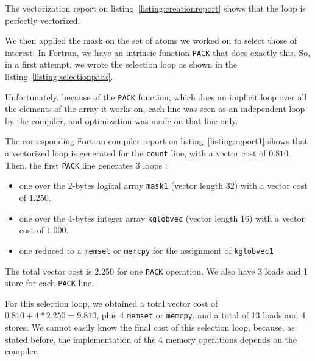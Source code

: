 \documentclass[9pt,comparison]{livecoms}
\newcommand{\lv}{\Large\verb}
\begin{document}
 The vectorization report on listing~\ref{listing:creationreport} shows that the loop is perfectly vectorized.
 



We then applied the mask on the set of atoms we worked on to select those of interest. In Fortran, we have an intrinsic function {\color{blue}\lv|PACK|} that does exactly this. So, in a first attempt, we wrote the selection loop as shown in the listing~\ref{listing:selectionpack}.\label{PACK} 

Unfortunately, because of the {\color{blue}\lv|PACK|} function, which does an implicit loop over all the elements of the array it works on, each line was seen as an independent loop by the compiler, and optimization was made on that line only. 

The corresponding Fortran compiler report on  listing~\ref{listing:report1} shows that a vectorized loop is generated for the {\color{blue}\lv|count|} line, with a vector cost of $0.810$. Then, the first {\color{blue}\lv|PACK|} line generates 3 loops :
\begin{itemize}
    \item one over the 2-bytes logical array {\color{blue}\lv|mask1|} (vector length 32) with a vector cost of $1.250$.
    \item one over the 4-bytes integer array {\color{blue}\lv|kglobvec|} (vector length 16) with a vector cost of $1.000$.
    \item one reduced to a {\color{codegreen}\lv|memset|} or {\color{codegreen}\lv|memcpy|} for the assignment of {\color{blue}\lv|kglobvec1|}
\end{itemize}

The total vector cost is $2.250$ for one {\color{blue}\lv|PACK|} operation. We also have 3 loads and 1 store for each {\color{blue}\lv|PACK|} line.

For this selection loop, we obtained a total vector cost of $0.810 + 4*2.250 = 9.810$, plus 4 {\color{codegreen}\lv|memset|} or {\color{codegreen}\lv|memcpy|}, and a total of 13 loads and 4 stores. We cannot easily know the final cost of this selection loop, because, as stated before, the implementation of the 4 memory operations depends on the compiler.


\end{document}
